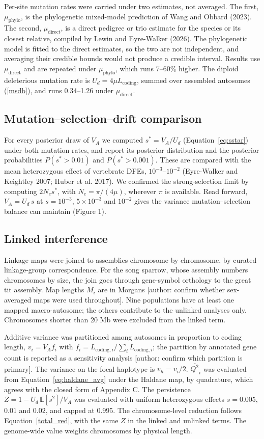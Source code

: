 \documentclass[12pt]{article}
\begin{document}
Per-site mutation rates were carried under two estimates, not averaged. The first, $\mu_\text{phylo}$, is the phylogenetic mixed-model prediction of Wang and Obbard (2023). The second, $\mu_\text{direct}$, is a direct pedigree or trio estimate for the species or its closest relative, compiled by Lewin and Eyre-Walker (2026). The phylogenetic model is fitted to the direct estimates, so the two are not independent, and averaging their credible bounds would not produce a credible interval. Results use $\mu_\text{direct}$ and are repeated under $\mu_\text{phylo}$, which runs 7--60\% higher. The diploid deleterious mutation rate is $U_d = 4\mu L_\text{coding}$, summed over assembled autosomes (\autoref{msdb}), and runs 0.34--1.26 under $\mu_\text{direct}$.

\subsection{Mutation--selection--drift comparison}
For every posterior draw of $V_A$ we computed $s^* = V_A/U_d$ (Equation~\eqref{eq:sstar}) under both mutation rates, and report its posterior distribution and the posterior probabilities $P(s^* > 0.01)$ and $P(s^* > 0.001)$. These are compared with the mean heterozygous effect of vertebrate DFEs, $10^{-3}$--$10^{-2}$ (Eyre-Walker and Keightley 2007; Huber et al. 2017). We confirmed the strong-selection limit by computing $2N_es^*$, with $N_e = \pi/(4\mu)$, wherever $\pi$ is available. Read forward, $V_A = U_d\,s$ at $s = 10^{-3}$, $5 \times 10^{-3}$ and $10^{-2}$ gives the variance mutation--selection balance can maintain (Figure 1).

\subsection{Linked interference}
Linkage maps were joined to assemblies chromosome by chromosome, by curated linkage-group correspondence. For the song sparrow, whose assembly numbers chromosomes by size, the join goes through gene-symbol orthology to the great tit assembly. Map lengths $M_i$ are in Morgans [author: confirm whether sex-averaged maps were used throughout]. Nine populations have at least one mapped macro-autosome; the others contribute to the unlinked analyses only. Chromosomes shorter than 20 Mb were excluded from the linked term.

Additive variance was partitioned among autosomes in proportion to coding length, $v_i = V_A f_i$ with $f_i = L_{\text{coding},i}/\sum_i L_{\text{coding},i}$; the partition by annotated gene count is reported as a sensitivity analysis [author: confirm which partition is primary]. The variance on the focal haplotype is $v_h = v_i/2$. $\overline{Q^2}_i$ was evaluated from Equation~\eqref{eq:haldane_avg} under the Haldane map, by quadrature, which agrees with the closed form of Appendix C. The persistence $Z = 1 - U_d\,\mathbb{E}[s^2]/V_A$ was evaluated with uniform heterozygous effects $s = 0.005$, $0.01$ and $0.02$, and capped at 0.995. The chromosome-level reduction follows Equation~\eqref{total_red}, with the same $Z$ in the linked and unlinked terms. The genome-wide value weights chromosomes by physical length.
\end{document}
